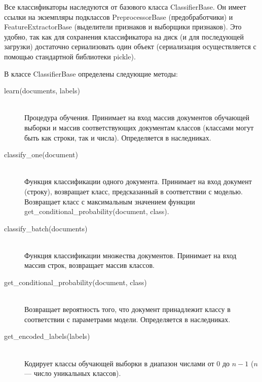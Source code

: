 Все классификаторы наследуются от базового класса ClassifierBase. 
Он имеет ссылки на экземпляры подклассов PreprocessorBase (предобработчики)
и FeatureExtractorBase (выделители признаков и выборщики признаков).
Это удобно, так как для сохранения классификатора на
диск (и для последующей загрузки) достаточно сериализовать 
один объект (сериализация осуществляется с помощью
стандартной библиотеки pickle).

В классе ClassifierBase определены следующие методы:
\begin{description}

\item[learn(documents, labels)] \hfill \\
Процедура обучения.
Принимает на вход массив документов обучающей выборки
и массив соответствующих документам классов 
(классами могут быть как строки, так и числа).
Определяется в наследниках.

\item[classify\_one(document)] \hfill \\
Функция классификации одного документа.
Принимает на вход документ (строку), возвращает класс,
предсказанный в соответствии с моделью.
Возвращает класс с максимальным значением
функции get\_conditional\_probability(document, class).

\item[classify\_batch(documents)] \hfill \\
Функция классификации множества документов.
Принимает на вход массив строк, возвращает массив классов.

\item[get\_conditional\_probability(document, class)] \hfill \\
Возвращает вероятность того, что документ принадлежит классу в соответствии с параметрами модели. Определяется в наследниках.

\item[get\_encoded\_labels(labels)] \hfill \\
Кодирует классы обучающей выборки в диапазон числами
от $0$ до $n-1$ ($n$ --- число уникальных классов).

\end{description}

\vspace{0.7cm}

